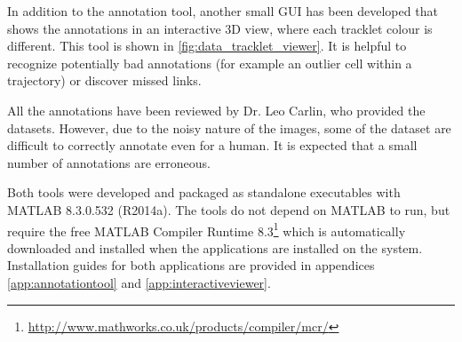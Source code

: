 		In addition to the annotation tool, another small GUI has been developed that shows the annotations in an interactive 3D view, where each tracklet colour is different. This tool is shown in \cref{fig:data_tracklet_viewer}. It is helpful to recognize potentially bad annotations (for example an outlier cell within a trajectory) or discover missed links.
		
		All the annotations have been reviewed by Dr. Leo Carlin, who provided the datasets. However, due to the noisy nature of the images, some of the dataset are difficult to correctly annotate even for a human. It is expected that a small number of annotations are erroneous.
		
		Both tools were developed and packaged as standalone executables with MATLAB 8.3.0.532 (R2014a). The tools do not depend on MATLAB to run, but require the free MATLAB Compiler Runtime 8.3\footnote{\url{http://www.mathworks.co.uk/products/compiler/mcr/}} which is automatically downloaded and installed when the applications are installed on the system. Installation guides for both applications are provided in appendices \ref{app:annotationtool} and \ref{app:interactiveviewer}.